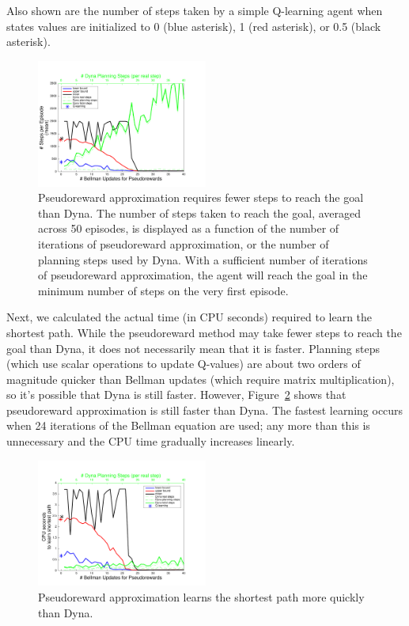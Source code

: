 \documentclass[letterpaper]{article}
\begin{document}
Also shown are the number of steps taken by a simple Q-learning agent when states values are initialized to 0 (blue asterisk), 1 (red asterisk), or 0.5 (black asterisk).

\begin{figure}[ht]
\centering
\includegraphics[width=0.5\textwidth]{learning_vs_PRiterations_DYNA_mean}
\caption{Pseudoreward approximation requires fewer steps to reach the goal than Dyna. The number of steps taken to reach the goal, averaged across 50 episodes, is displayed as a function of the number of iterations of pseudoreward approximation, or the number of planning steps used by Dyna. With a sufficient number of iterations of pseudoreward approximation, the agent will reach the goal in the minimum number of steps on the very first episode.}
\label{fig:maze1}
\end{figure}

Next, we calculated the actual time (in CPU seconds) required to learn the shortest path. While the pseudoreward method may take fewer steps to reach the goal than Dyna, it does not necessarily mean that it is faster. Planning steps (which use scalar operations to update Q-values) are about two orders of magnitude quicker than Bellman updates (which require matrix multiplication), so it's possible that Dyna is still faster. However, Figure~\ref{fig:maze2} shows that pseudoreward approximation is still faster than Dyna. The fastest learning occurs when 24 iterations of the Bellman equation are used; any more than this is unnecessary and the CPU time gradually increases linearly.

\begin{figure}[ht]
\centering
\includegraphics[width=0.5\textwidth]{cpus_vs_PRiterations_DYNA_toGoal}
\caption{Pseudoreward approximation learns the shortest path more quickly than Dyna.}
\label{fig:maze2}
\end{figure}
\end{document}
